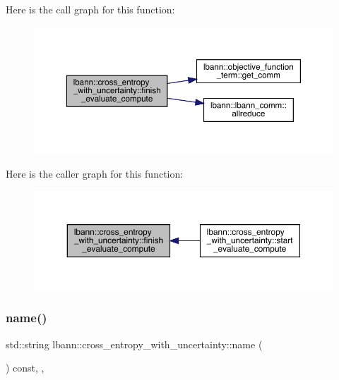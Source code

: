 Here is the call graph for this function\+:\nopagebreak
\begin{figure}[H]
\begin{center}
\leavevmode
\includegraphics[width=350pt]{classlbann_1_1cross__entropy__with__uncertainty_abb9b240766b395dab052e3225a0888f6_cgraph}
\end{center}
\end{figure}
Here is the caller graph for this function\+:\nopagebreak
\begin{figure}[H]
\begin{center}
\leavevmode
\includegraphics[width=350pt]{classlbann_1_1cross__entropy__with__uncertainty_abb9b240766b395dab052e3225a0888f6_icgraph}
\end{center}
\end{figure}
\mbox{\label{classlbann_1_1cross__entropy__with__uncertainty_a56d734c6665ac1752d8ef821edf2f464}} 
\subsubsection{\texorpdfstring{name()}{name()}}
{\footnotesize\ttfamily std\+::string lbann\+::cross\+\_\+entropy\+\_\+with\+\_\+uncertainty\+::name (\begin{DoxyParamCaption}{ }\end{DoxyParamCaption}) const\hspace{0.3cm}{\ttfamily [inline]}, {\ttfamily [override]}, {\ttfamily [virtual]}}

